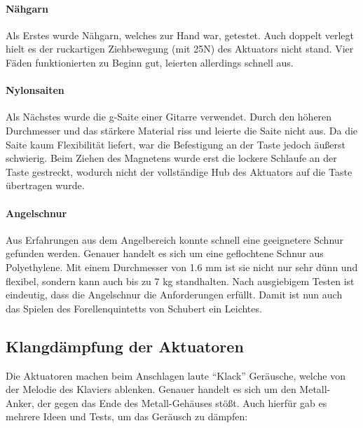 \paragraph{Nähgarn}

Als Erstes wurde Nähgarn, welches zur Hand war, getestet.
Auch doppelt verlegt hielt es der ruckartigen Ziehbewegung (mit 25N) des Aktuators nicht stand.
Vier Fäden funktionierten zu Beginn gut, leierten allerdings schnell aus.

\paragraph{Nylonsaiten}

Als Nächstes wurde die g-Saite einer Gitarre verwendet.
Durch den höheren Durchmesser und das stärkere Material riss und leierte die Saite nicht aus.
Da die Saite kaum Flexibilität liefert, war die Befestigung an der Taste jedoch äußerst schwierig.
Beim Ziehen des Magnetens wurde erst die lockere Schlaufe an der Taste gestreckt, wodurch nicht der vollständige Hub des Aktuators auf die Taste übertragen wurde.

\paragraph{Angelschnur}

Aus Erfahrungen aus dem Angelbereich konnte schnell eine geeignetere Schnur gefunden werden.
Genauer handelt es sich um eine geflochtene Schnur aus Polyethylene.
Mit einem Durchmesser von 1.6 mm ist sie nicht nur sehr dünn und flexibel, sondern kann auch bis zu 7 kg standhalten.
Nach ausgiebigem Testen ist eindeutig, dass die Angelschnur die Anforderungen erfüllt.
Damit ist nun auch das Spielen des Forellenquintetts von Schubert ein Leichtes.

\subsection{Klangdämpfung der Aktuatoren}


Die Aktuatoren machen beim Anschlagen laute \enquote{Klack} Geräusche, welche von der Melodie des Klaviers ablenken.
Genauer handelt es sich um den Metall-Anker, der gegen das Ende des Metall-Gehäuses stößt.
Auch hierfür gab es mehrere Ideen und Tests, um das Geräusch zu dämpfen:

